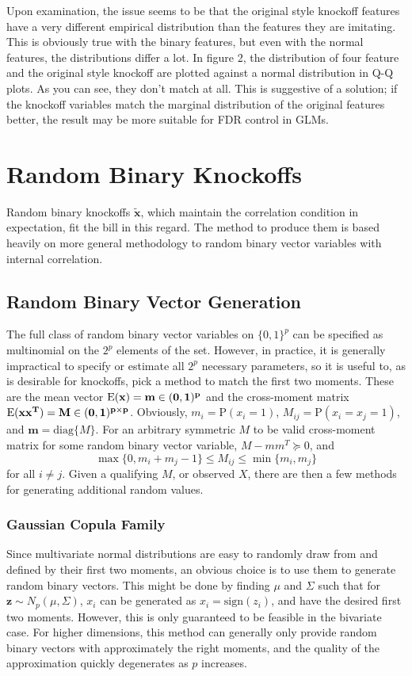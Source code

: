 \documentclass[11pt]{article}
\newcommand{\p}{\mathrm{P}}
\newcommand{\E}{\mathrm{E}}
\newcommand{\diag}[1]{\mathrm{diag}\{#1\}}
\theoremstyle{definition}
\begin{document}
    Upon examination, the issue seems to be that the original style knockoff features have a very different empirical distribution than the features they are imitating. This is obviously true with the binary features, but even with the normal features, the distributions differ a lot. In figure 2, the distribution of four feature and the original style knockoff are plotted against a normal distribution in Q-Q plots. As you can see, they don't match at all. This is suggestive of a solution; if the knockoff variables match the marginal distribution of the original features better, the result may be more suitable for FDR control in GLMs. \par
    \FloatBarrier

\section{Random Binary Knockoffs}
Random binary knockoffs $\mathbf{\tilde x}$, which maintain the correlation condition in expectation, fit the bill in this regard. The method to produce them is based heavily on more general methodology to random binary vector variables with internal correlation.

\subsection{Random Binary Vector Generation}
The full class of random binary vector variables on $\{0,1\}^p$ can be specified as multinomial on the $2^p$ elements of the set. However, in practice, it is generally impractical to specify or estimate all $2^p$ necessary parameters, so it is useful to, as is desirable for knockoffs, pick a method to match the first two moments. These are the mean vector $\E(\bf x)=m\in(0,1)^p$ and the cross-moment matrix $\E(\bf x\bf x^T)=M\in(0,1)^{p\times p}$. Obviously, $m_i = \p(x_i=1)$, $M_{ij} = \p(x_i=x_j=1)$, and $\mathbf m=\diag{M}$. For an arbitrary symmetric $M$ to be valid cross-moment matrix for some random binary vector variable, $M-mm^T\succeq0$, and
    \[ \max\{0,m_i+m_j -1\} \leq M_{ij} \leq \min\{m_i,m_j\}\]
    for all $i\neq j.$ Given a qualifying $M$, or observed $X$, there are then a few methods for generating additional random values.

\subsubsection{Gaussian Copula Family}
Since multivariate normal distributions are easy to randomly draw from and defined by their first two moments, an obvious choice is to use them to generate random binary vectors. This might be done by finding $\mu$ and $\Sigma$ such that for $\mathbf z\sim N_p(\mu,\Sigma)$, $x_i$ can be generated as $x_i = \mathrm{sign}(z_i)$, and have the desired first two moments. However, this is only guaranteed to be feasible in the bivariate case. For higher dimensions, this method can generally only provide random binary vectors with approximately the right moments, and the quality of the approximation quickly degenerates as $p$ increases.
\end{document}
